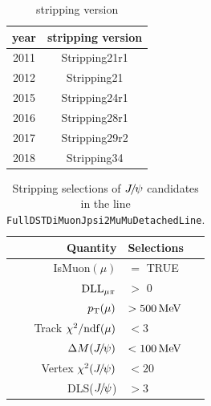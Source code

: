 \begin{table}[t]
\centering
\caption{stripping version}
\begin{tabular}{cc}
\hline
year & stripping version \\
\hline \hline
2011 & Stripping21r1     \\
2012 & Stripping21       \\
2015 & Stripping24r1     \\
2016 & Stripping28r1     \\
2017 & Stripping29r2     \\
2018 & Stripping34      \\
\hline
\end{tabular}
\normalsize
\label{stripping}
\end{table}


\begin{table}[tbh]
\caption{Stripping selections of ${{J\mskip -3mu/\mskip -2mu\psi}}$ candidates in the line \texttt{FullDSTDiMuonJpsi2MuMuDetachedLine}.}
\centering
\begin{tabular}{rl}
\hline
Quantity               & Selections \\
\hline
IsMuon$(\mu)$          & $=$ TRUE \\
$\mathrm{DLL}_{{\mu}\pi}$     & $>$ 0\\
$p_{\mathrm{T}}(\mu)$             & $>500\text{\,Me\kern -0.1em V}$ \\
Track $\chi^2/\mathrm{ndf}(\mu)$ & $<3$  \\
$\Delta M({{J\mskip -3mu/\mskip -2mu\psi}})$      & $<100\text{\,Me\kern -0.1em V}$\\
Vertex $\chi^2({{J\mskip -3mu/\mskip -2mu\psi}})$ & $<20$ \\
DLS(${{J\mskip -3mu/\mskip -2mu\psi}}$)           & $>3$  \\
\hline
\end{tabular}
\label{tab:JpsiSelection}
\end{table}

